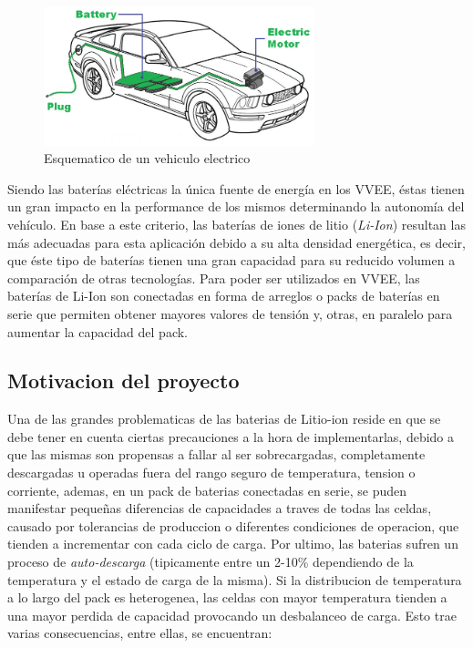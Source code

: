 \documentclass[10pt,a4paper]{article}
\begin{document}
    \begin{figure}[h!]
        \begin{center}
            \includegraphics[width=0.7\textwidth]{EV.png}
            \caption{Esquematico de un vehiculo electrico}
            \label{EV}
        \end{center}
    \end{figure}


	\noindent Siendo las baterías eléctricas la única fuente de energía en los 
    VVEE, éstas tienen un gran impacto en la performance de los mismos 
    determinando la autonomía del vehículo. En base a este criterio, las 
    baterías de iones de litio (\emph{Li-Ion}) resultan las más adecuadas para 
    esta aplicación debido a su alta densidad energética, es decir, que éste 
    tipo de baterías tienen una gran capacidad para su reducido volumen a 
    comparación de otras tecnologías. Para poder ser utilizados en VVEE, las 
    baterías de Li-Ion son conectadas en forma de arreglos o packs de baterías 
    en serie que permiten obtener mayores valores de tensión y, otras, en 
    paralelo para aumentar la capacidad del pack. 

    \subsection{Motivacion del proyecto}
	
	\noindent Una de las grandes problematicas de las baterias de Litio-ion 
    reside en que se debe tener en cuenta ciertas precauciones a la hora de
    implementarlas, debido a que las mismas son propensas a fallar al ser 
    sobrecargadas, completamente descargadas u operadas fuera del
    rango seguro de temperatura, tension o corriente, ademas, en un pack de 
    baterias conectadas en serie, se puden manifestar pequeñas diferencias de 
    capacidades a traves de todas las celdas, causado por tolerancias de
    produccion o diferentes condiciones de operacion, que tienden
    a incrementar con cada ciclo de carga. Por ultimo, las baterias
    sufren un proceso de \emph{auto-descarga} (tipicamente entre un
    2-10\% dependiendo de la temperatura y el estado de carga de la misma). 
    Si la distribucion de temperatura a lo largo del pack es
    heterogenea, las celdas con mayor temperatura tienden a una mayor
    perdida de capacidad provocando un desbalanceo de carga.
    Esto trae varias consecuencias, entre ellas, se encuentran:
\end{document}
